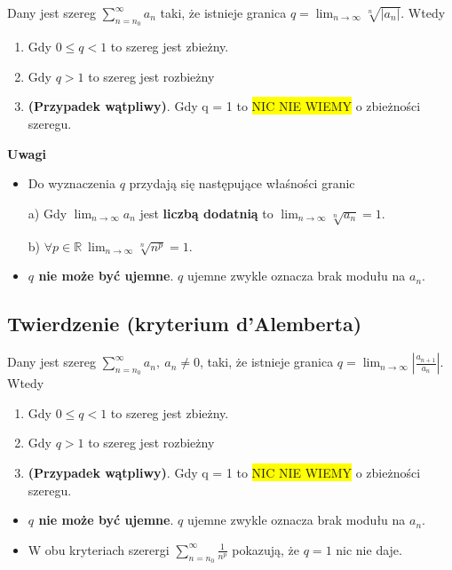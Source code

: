 Dany jest szereg $ \sum\limits_{n = n_0}^{\infty} a_n $ taki, że istnieje granica $ q = \lim_{n \to \infty} \sqrt[n]{|a_n|} $. Wtedy

\begin{enumerate}
    \item Gdy $ 0 \leq q < 1 $ to szereg jest zbieżny.
    \item Gdy $ q > 1 $ to szereg jest rozbieżny
    \item \textbf{(Przypadek wątpliwy)}. Gdy q = 1 to \colorbox{yellow}{NIC NIE WIEMY} o zbieżności szeregu. \\
\end{enumerate}

\textbf{Uwagi}

\begin{itemize}
    \item Do wyznaczenia $q$ przydają się następujące właśności granic
    
    a) Gdy $ \lim_{n \to \infty} a_n $ jest \textbf{liczbą dodatnią} to $ \lim_{n \to \infty} \sqrt[n]{a_n} = 1 $.

    b) $ \forall p \in \mathbb{R} \ \lim_{n \to \infty} \sqrt[n]{n^p} = 1 $.

    \item \textbf{$q$ nie może być ujemne}. $q$ ujemne zwykle oznacza brak modułu na $a_n$.
\end{itemize}


\subsection*{Twierdzenie (kryterium d'Alemberta)}

Dany jest szereg $ \sum\limits_{n = n_0}^{\infty} a_n, \ a_n \neq 0 $, taki, że istnieje granica
$ q = \lim_{n \to \infty} \left| \frac{a_{n + 1}}{a_n} \right| $. Wtedy

\begin{enumerate}
    \item Gdy $ 0 \leq q < 1 $ to szereg jest zbieżny.
    \item Gdy $ q > 1 $ to szereg jest rozbieżny
    \item \textbf{(Przypadek wątpliwy)}. Gdy q = 1 to \colorbox{yellow}{NIC NIE WIEMY} o zbieżności szeregu. \\
\end{enumerate}

\begin{itemize}
    \item \textbf{$q$ nie może być ujemne}. $q$ ujemne zwykle oznacza brak modułu na $a_n$.
    
    \item W obu kryteriach szerergi $ \sum\limits_{n = n_0}^{\infty} \frac{1}{n^p} $ pokazują, że $ q = 1$ nic nie daje. \\
\end{itemize}

